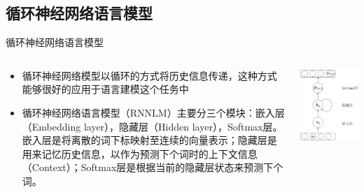 \documentclass[14pt]{Bredelebeamer}
\begin{document}
\subsection{循环神经网络语言模型}
\begin{frame}{循环神经网络语言模型}
\begin{columns}
\begin{column}{.6\textwidth}
\begin{itemize}
\item 循环神经网络模型以循环的方式将历史信息传递，这种方式能够很好的应用于语言建模这个任务中
\item 循环神经网络语言模型（RNNLM）主要分三个模块：嵌入层（Embedding layer），隐藏层（Hidden layer），Softmax层。嵌入层是将离散的词下标映射至连续的向量表示；隐藏层是用来记忆历史信息，以作为预测下个词时的上下文信息（Context）；Softmax层是根据当前的隐藏层状态来预测下个词。
\end{itemize}

\end{column}

\begin{column}{.4\textwidth}
\centering
\includegraphics[width=1.\textwidth]{images/rnnlm.png}
\end{column}
\end{columns}
\end{frame}
\end{document}
